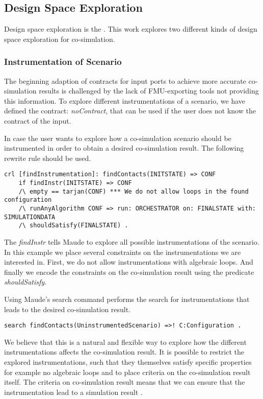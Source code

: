 \subsection{Design Space Exploration}
Design space exploration is the .
This work explores two different kinds of design space exploration for co-simulation.


\subsubsection{Instrumentation of Scenario}
The beginning adaption of contracts for input ports to achieve more accurate co-simulation results is challenged by the lack of FMU-exporting tools not providing this information. 
To explore different instrumentations of a scenario, we have defined the contract: \textit{noContract}, that can be used if the user does not know the contract of the input.

In case the user wants to explore how a co-simulation scenario should be instrumented in order to obtain a desired co-simulation result.
The following rewrite rule should be used. 
\begin{lstlisting}
crl [findInstrumentation]: findContacts(INITSTATE) => CONF
    if findInstr(INITSTATE) => CONF
    /\ empty == tarjan(CONF) *** We do not allow loops in the found configuration
    /\ runAnyAlgorithm CONF => run: ORCHESTRATOR on: FINALSTATE with: SIMULATIONDATA
    /\ shouldSatisfy(FINALSTATE) .
\end{lstlisting}

The \textit{findInstr} tells Maude to explore all possible instrumentations of the scenario. 
In this example we place several constraints on the instrumentations we are interested in.
First, we do not allow instrumentations with algebraic loops. 
And finally we encode the constraints on the co-simulation result using the predicate \textit{shouldSatisfy}.

Using Maude's search command performs the search for instrumentations that leads to the desired co-simulation result.

\begin{lstlisting}
search findContacts(UninstrumentedScenario) =>! C:Configuration .
\end{lstlisting}

We believe that this is a natural and flexible way to explore how the different instrumentations affects the co-simulation result.
It is possible to restrict the explored instrumentations, such that they themselves satisfy specific properties for example no algebraic loops and to place criteria on the co-simulation result itself. 
The criteria on co-simulation result means that we can ensure that the instrumentation lead to a simulation result .


